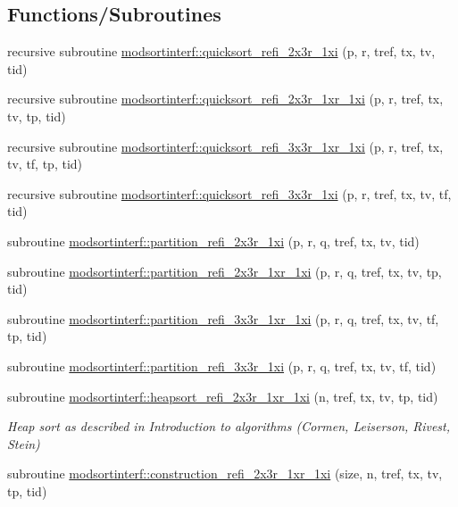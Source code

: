 \subsection*{Functions/\+Subroutines}
\begin{DoxyCompactItemize}
\item 
recursive subroutine \hyperlink{namespacemodsortinterf_a083e6e7591f58e1473c8d0027dec8811}{modsortinterf\+::quicksort\+\_\+refi\+\_\+2x3r\+\_\+1xi} (p, r, tref, tx, tv, tid)
\item 
recursive subroutine \hyperlink{namespacemodsortinterf_a4a0d6eb151ffef0f10e55f3b4f6bbd4c}{modsortinterf\+::quicksort\+\_\+refi\+\_\+2x3r\+\_\+1xr\+\_\+1xi} (p, r, tref, tx, tv, tp, tid)
\item 
recursive subroutine \hyperlink{namespacemodsortinterf_a84b8a8187e575b463e701c9660e060ed}{modsortinterf\+::quicksort\+\_\+refi\+\_\+3x3r\+\_\+1xr\+\_\+1xi} (p, r, tref, tx, tv, tf, tp, tid)
\item 
recursive subroutine \hyperlink{namespacemodsortinterf_a4e2275566fd82541954638bda4797d5b}{modsortinterf\+::quicksort\+\_\+refi\+\_\+3x3r\+\_\+1xi} (p, r, tref, tx, tv, tf, tid)
\item 
subroutine \hyperlink{namespacemodsortinterf_aa3bf097c9f86c18f8d7b4584b966c4b3}{modsortinterf\+::partition\+\_\+refi\+\_\+2x3r\+\_\+1xi} (p, r, q, tref, tx, tv, tid)
\item 
subroutine \hyperlink{namespacemodsortinterf_afb245c76ff89ec76fd050a43eabcecd9}{modsortinterf\+::partition\+\_\+refi\+\_\+2x3r\+\_\+1xr\+\_\+1xi} (p, r, q, tref, tx, tv, tp, tid)
\item 
subroutine \hyperlink{namespacemodsortinterf_a1cc99117f29237a3a9a368981a8ccd67}{modsortinterf\+::partition\+\_\+refi\+\_\+3x3r\+\_\+1xr\+\_\+1xi} (p, r, q, tref, tx, tv, tf, tp, tid)
\item 
subroutine \hyperlink{namespacemodsortinterf_ac2c52347c0eec87e2c2e6df84257a6d9}{modsortinterf\+::partition\+\_\+refi\+\_\+3x3r\+\_\+1xi} (p, r, q, tref, tx, tv, tf, tid)
\item 
subroutine \hyperlink{namespacemodsortinterf_ada0c844a63cc8db123d38c60d4d1fb9b}{modsortinterf\+::heapsort\+\_\+refi\+\_\+2x3r\+\_\+1xr\+\_\+1xi} (n, tref, tx, tv, tp, tid)
\begin{DoxyCompactList}\small\item\em Heap sort as described in Introduction to algorithms (Cormen, Leiserson, Rivest, Stein) \end{DoxyCompactList}\item 
subroutine \hyperlink{namespacemodsortinterf_a4f6ae4d8da475aa6c30f51216d5b49f7}{modsortinterf\+::construction\+\_\+refi\+\_\+2x3r\+\_\+1xr\+\_\+1xi} (size, n, tref, tx, tv, tp, tid)

\end{DoxyCompactItemize}
